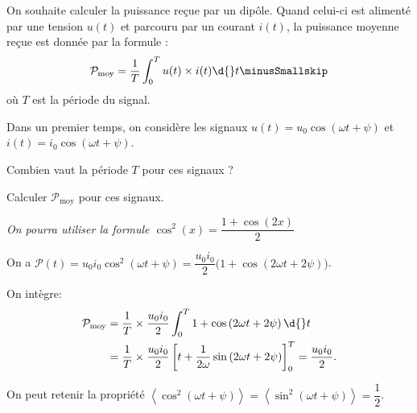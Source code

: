 On souhaite calculer la puissance reçue par un dipôle. Quand celui-ci est alimenté par une tension $u(t)$ et parcouru par un courant $i(t)$, la puissance moyenne reçue est donnée par la formule :
\[
\mathcal{P}_{\text{moy}}=%
\dfrac{1}{T}\int_{0}^{T}u(t)\times i(t)\d{}t \minusSmallskip
\]
où $T$ est la période du signal.%

\debutEntrainement

%
%

\bigskip

Dans un premier temps, on considère les signaux
$u(t)=u_{0}\cos\left(\omega t+\psi\right)$ et 
$i(t)=i_{0}\cos\left(\omega t+\psi\right)$.


\begin{enonce}
Combien vaut la période $T$ pour ces signaux ?
\end{enonce}

\reponse{$\dfrac{2\pi}{\omega}$}






\begin{enonce}
Calculer $\mathcal{P}_{\text{moy}}$ pour ces signaux. \minusBigskip

{\itshape On pourra utiliser la formule $\cos^2(x)=\dfrac{1+\cos (2x)}{2} $}
\end{enonce}


\begin{corrige}
On a $\mathcal{P}(t)=u_{0}i_{0}\cos^{2}\left(\omega t+\psi\right)=\dfrac{u_{0}i_{0}}{2}
\Big(1+\cos\left(2\omega t+2\psi\right)\Big)$.

On intègre:
\begin{align*}
\mathcal{P}_{\text{moy}} 
& =\dfrac{1}{T}\times\dfrac{u_{0}i_{0}}{2}\int_{0}^{T}1+\cos\left(2\omega t+2\psi\right)\d{}t\\
 & =\dfrac{1}{T}\times\dfrac{u_{0}i_{0}}{2}\left[t+\dfrac{1}{2\omega}\sin\left(2\omega t+2\psi\right)\right]_{0}^{T}=\dfrac{u_{0}i_{0}}{2}.
\end{align*}

On peut retenir la propriété $\left\langle \cos^{2}\left(\omega t+\psi\right)\right\rangle =\left\langle \sin^{2}\left(\omega t+\psi\right)\right\rangle =\dfrac{1}{2}$.
\end{corrige}

